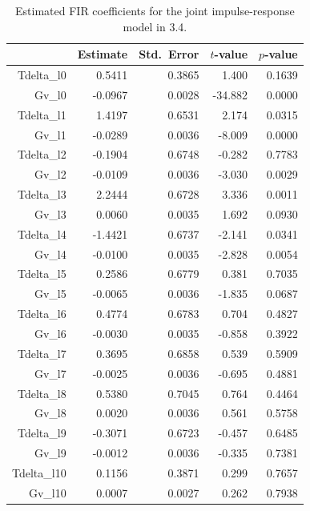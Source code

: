 \begin{table}[ht]
\centering
\caption{Estimated FIR coefficients for the joint impulse-response model in 3.4.} 
\label{tab:q3_fir_coef}
\begin{tabular}{rrrrr}
  \toprule
 & Estimate & Std.\ Error & $t$-value & $p$-value \\ 
  \midrule
Tdelta_l0 & 0.5411 & 0.3865 & 1.400 & 0.1639 \\ 
  Gv_l0 & -0.0967 & 0.0028 & -34.882 & 0.0000 \\ 
  Tdelta_l1 & 1.4197 & 0.6531 & 2.174 & 0.0315 \\ 
  Gv_l1 & -0.0289 & 0.0036 & -8.009 & 0.0000 \\ 
  Tdelta_l2 & -0.1904 & 0.6748 & -0.282 & 0.7783 \\ 
  Gv_l2 & -0.0109 & 0.0036 & -3.030 & 0.0029 \\ 
  Tdelta_l3 & 2.2444 & 0.6728 & 3.336 & 0.0011 \\ 
  Gv_l3 & 0.0060 & 0.0035 & 1.692 & 0.0930 \\ 
  Tdelta_l4 & -1.4421 & 0.6737 & -2.141 & 0.0341 \\ 
  Gv_l4 & -0.0100 & 0.0035 & -2.828 & 0.0054 \\ 
  Tdelta_l5 & 0.2586 & 0.6779 & 0.381 & 0.7035 \\ 
  Gv_l5 & -0.0065 & 0.0036 & -1.835 & 0.0687 \\ 
  Tdelta_l6 & 0.4774 & 0.6783 & 0.704 & 0.4827 \\ 
  Gv_l6 & -0.0030 & 0.0035 & -0.858 & 0.3922 \\ 
  Tdelta_l7 & 0.3695 & 0.6858 & 0.539 & 0.5909 \\ 
  Gv_l7 & -0.0025 & 0.0036 & -0.695 & 0.4881 \\ 
  Tdelta_l8 & 0.5380 & 0.7045 & 0.764 & 0.4464 \\ 
  Gv_l8 & 0.0020 & 0.0036 & 0.561 & 0.5758 \\ 
  Tdelta_l9 & -0.3071 & 0.6723 & -0.457 & 0.6485 \\ 
  Gv_l9 & -0.0012 & 0.0036 & -0.335 & 0.7381 \\ 
  Tdelta_l10 & 0.1156 & 0.3871 & 0.299 & 0.7657 \\ 
  Gv_l10 & 0.0007 & 0.0027 & 0.262 & 0.7938 \\ 
   \bottomrule
\end{tabular}
\end{table}
